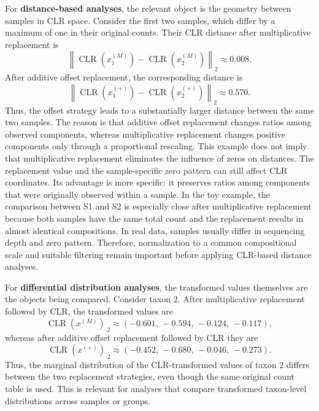 For \textbf{distance-based analyses}, the relevant object is the geometry between samples in CLR space. Consider the first two samples, which differ by a maximum of one in their original counts. Their CLR distance after multiplicative replacement is
\begin{equation}
\left\|\operatorname{CLR}(x_1^{(M)})-\operatorname{CLR}(x_2^{(M)})\right\|_2 \approx 0.008.
\label{eq:2micro::mult_replacement_distance_example}
\end{equation}
After additive offset replacement, the corresponding distance is
\begin{equation}
\left\|\operatorname{CLR}(x_1^{(+)})-\operatorname{CLR}(x_2^{(+)})\right\|_2 \approx 0.570.
\label{eq:2micro:additive_offset_distance_example}
\end{equation}
Thus, the offset strategy leads to a substantially larger distance between the same two samples. The reason is that additive offset replacement changes ratios among observed components, whereas multiplicative replacement changes positive components only through a proportional rescaling. This example does not imply that multiplicative replacement eliminates the influence of zeros on distances. The replacement value and the sample-specific zero pattern can still affect CLR coordinates. Its advantage is more specific: it preserves ratios among components that were originally observed within a sample. In the toy example, the comparison between S1 and S2 is especially close after multiplicative replacement because both samples have the same total count and the replacement results in almost identical compositions. In real data, samples usually differ in sequencing depth and zero pattern. Therefore, normalization to a common compositional scale and suitable filtering remain important before applying CLR-based distance analyses.

For \textbf{differential distribution analyses}, the transformed values themselves are the objects being compared. Consider taxon 2. After multiplicative replacement followed by CLR, the transformed values are
\begin{equation}
\operatorname{CLR}(x^{(M)})_{\cdot 2}
\approx
(-0.601,\,-0.594,\,-0.124,\,-0.117),
\label{eq:2micro:mult_replacement_taxon2_clr_values}
\end{equation}
whereas after additive offset replacement followed by CLR they are
\begin{equation}
\operatorname{CLR}(x^{(+)})_{\cdot 2}
\approx
(-0.452,\,-0.680,\,-0.046,\,-0.273).
\label{eq:2micro:additive_offset_taxon2_clr_values}
\end{equation}
Thus, the marginal distribution of the CLR-transformed values of taxon 2 differs between the two replacement strategies, even though the same original count table is used. This is relevant for analyses that compare transformed taxon-level distributions across samples or groups.

